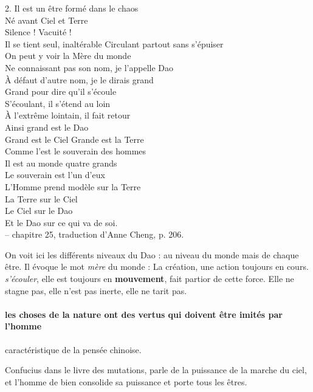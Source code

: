 \begin{singlequote}
    2.	Il est un être formé dans le chaos  \\Né avant Ciel et Terre \\
Silence ! Vacuité ! \\
Il se tient seul, inaltérable Circulant partout sans s’épuiser \\ On peut y voir la Mère du monde \\
Ne connaissant pas son nom, je l’appelle Dao  \\ À défaut d’autre nom, je le dirais grand  \\Grand pour dire qu’il s’écoule \\
S’écoulant, il s’étend au loin \\
À l’extrême lointain, il fait retour  \\Ainsi grand est le Dao \\
Grand est le Ciel Grande est la Terre \\
Comme l’est le souverain des hommes  \\Il est au monde quatre grands \\
Le souverain est l’un d’eux  \\L’Homme prend modèle sur la Terre  \\La Terre sur le Ciel \\
Le Ciel sur le Dao \\
Et le Dao sur ce qui va de soi. \\
-- chapitre 25, traduction d’Anne Cheng, p. 206.
\end{singlequote}

On voit ici les différents niveaux du Dao : au niveau du monde mais de chaque être.
Il évoque le mot \textit{mère} du monde : La création, une action toujours en cours. 
\textit{s'écouler}, elle est toujours en \textbf{mouvement}, fait partior de cette force. Elle ne stagne pas, elle n'est pas inerte, elle ne tarit pas. 

\paragraph{les choses de la nature ont des vertus qui doivent être imités par l'homme} caractéristique de la pensée chinoise.
\begin{Ex}
Confucius dans le livre des mutations, parle de la puissance de la marche du ciel, et l'homme de bien consolide sa puissance et porte tous les êtres.
\end{Ex}


